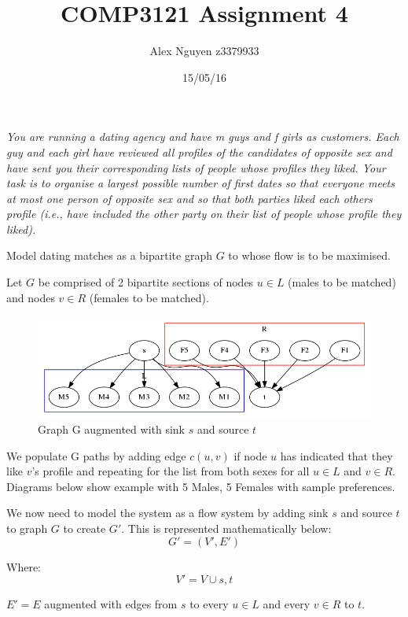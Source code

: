 \documentclass[11pt, a4paper]{article}
\title{COMP3121 Assignment 4}
\author{Alex Nguyen z3379933}
\date{15/05/16}
\begin{document}

\vspace{2mm}
\textit{You are running a dating agency and have m guys and f girls as customers. Each guy
and each girl have reviewed all profiles of the candidates of opposite sex and have
sent you their corresponding lists of people whose profiles they liked. Your task is to
organise a largest possible number of first dates so that everyone meets at most one
person of opposite sex and so that both parties liked each others profile (i.e., have
included the other party on their list of people whose profile they liked).
}


\vspace{5mm}

Model dating matches as a bipartite graph $G$ to whose flow is to be maximised.

Let $G$ be comprised of 2 bipartite sections of nodes $u \in L$ (males to be
matched) and nodes $v \in R$ (females to be matched).


\begin{figure}[ht!]
\centering
\includegraphics[scale=0.5]{q1empty.png}
\caption{Graph G augmented with sink $s$ and source $t$\label{overflow}}
\end{figure}

We populate G paths by adding edge $c(u, v)$ if node $u$ has indicated that they like
$v$'s profile and repeating for the list from both sexes for all $u \in L$ and
$v \in R$. Diagrams below show example with 5 Males, 5 Females with sample
preferences.

We now need to model the system as a flow system by adding sink $s$ and source
$t$ to graph $G$ to create $G'$.
This is represented mathematically below:
\[ G' = (V', E')\]

Where: 
\[V' = V \cup {s,t}\] 

\hspace{30mm}$E' = E$ augmented with edges from $s$ to every $u
\in L $ and every $v \in R$ to $t$.
\end{document}

